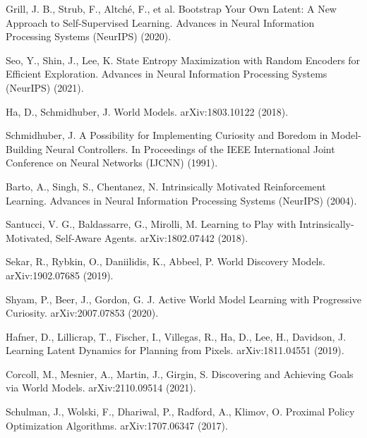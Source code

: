 \begin{thebibliography}{99}
   Grill, J. B., Strub, F., Altché, F., et al.
   Bootstrap Your Own Latent: A New Approach to Self-Supervised Learning.
   Advances in Neural Information Processing Systems (NeurIPS) (2020).

   Seo, Y., Shin, J., Lee, K.
   State Entropy Maximization with Random Encoders for Efficient Exploration.
   Advances in Neural Information Processing Systems (NeurIPS) (2021).

   Ha, D., Schmidhuber, J.
   World Models.
   arXiv:1803.10122 (2018).

   Schmidhuber, J.
   A Possibility for Implementing Curiosity and Boredom in Model-Building Neural Controllers.
   In Proceedings of the IEEE International Joint Conference on Neural Networks (IJCNN) (1991).

   Barto, A., Singh, S., Chentanez, N.
   Intrinsically Motivated Reinforcement Learning.
   Advances in Neural Information Processing Systems (NeurIPS) (2004).

   Santucci, V. G., Baldassarre, G., Mirolli, M.
   Learning to Play with Intrinsically-Motivated, Self-Aware Agents.
   arXiv:1802.07442 (2018).

   Sekar, R., Rybkin, O., Daniilidis, K., Abbeel, P.
   World Discovery Models.
   arXiv:1902.07685 (2019).

   Shyam, P., Beer, J., Gordon, G. J.
   Active World Model Learning with Progressive Curiosity.
   arXiv:2007.07853 (2020).

   Hafner, D., Lillicrap, T., Fischer, I., Villegas, R., Ha, D., Lee, H., Davidson, J.
   Learning Latent Dynamics for Planning from Pixels.
   arXiv:1811.04551 (2019).

   Corcoll, M., Mesnier, A., Martin, J., Girgin, S.
   Discovering and Achieving Goals via World Models.
   arXiv:2110.09514 (2021).

   Schulman, J., Wolski, F., Dhariwal, P., Radford, A., Klimov, O.
   Proximal Policy Optimization Algorithms.
   arXiv:1707.06347 (2017).

\end{thebibliography}
